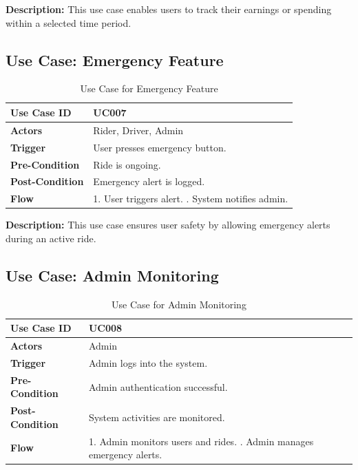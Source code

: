 \noindent
\textbf{Description:} This use case enables users to track their earnings or spending within a selected time period.

\subsection{Use Case: Emergency Feature}

\begin{table}[H]
\centering

\label{tab:usecase-emergency}
\renewcommand{\arraystretch}{1.2}
\begin{tabular}{|>{\bfseries}l|p{10cm}|}
\hline
Use Case ID & UC007 \\ \hline
Actors & Rider, Driver, Admin \\ \hline
Trigger & User presses emergency button. \\ \hline
Pre-Condition & Ride is ongoing. \\ \hline
Post-Condition & Emergency alert is logged. \\ \hline
Flow &
1. User triggers alert. \newline
2. System notifies admin. \\ \hline
\end{tabular}
\caption{Use Case for Emergency Feature}
\end{table}

\noindent
\textbf{Description:} This use case ensures user safety by allowing emergency alerts during an active ride.


\subsection{Use Case: Admin Monitoring}

\begin{table}[H]
\centering

\label{tab:usecase-admin}
\renewcommand{\arraystretch}{1.2}
\begin{tabular}{|>{\bfseries}l|p{10cm}|}
\hline
Use Case ID & UC008 \\ \hline
Actors & Admin \\ \hline
Trigger & Admin logs into the system. \\ \hline
Pre-Condition & Admin authentication successful. \\ \hline
Post-Condition & System activities are monitored. \\ \hline
Flow &
1. Admin monitors users and rides. \newline
2. Admin manages emergency alerts. \\ \hline
\end{tabular}
\caption{Use Case for Admin Monitoring}
\end{table}

